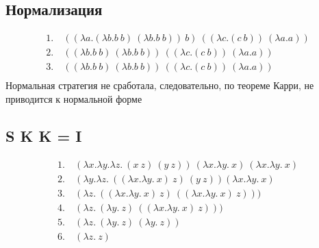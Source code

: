 \documentclass{article}
\begin{document}
\section*{}
\subsection*{Нормализация}

\begin{align*}
1.\ & ((\lambda a.(\lambda b.b\ b)\ (\lambda b.b\ b))\ b)\ ((\lambda c.(c\ b))\ (\lambda a.a)) \\
2.\ & ((\lambda b.b\ b)\ (\lambda b.b\ b))\ ((\lambda c.(c\ b))\ (\lambda a.a)) \\
3.\ & ((\lambda b.b\ b)\ (\lambda b.b\ b))\ ((\lambda c.(c\ b))\ (\lambda a.a)) \\
\end{align*}
Нормальная стратегия не сработала, следовательно, по теореме Карри, не приводится к нормальной форме

\subsection*{S K K = I}
\begin{align*}
1.\ & (\lambda x.\lambda y.\lambda z.\ (x\ z)\ (y\ z))\ (\lambda x.\lambda y.\ x)\ (\lambda x.\lambda y.\ x) \\
2.\ & (\lambda y.\lambda z.\ ((\lambda x.\lambda y.\ x)\ z)\ (y\ z))(\lambda x.\lambda y.\ x)  \\
3.\ & (\lambda z.\ ((\lambda x.\lambda y.\ x)\ z)\ ((\lambda x.\lambda y.\ x)\ z)))  \\
4.\ & (\lambda z.\ (\lambda y.\ z)\ ((\lambda x.\lambda y.\ x)\ z)))  \\
5.\ & (\lambda z.\ (\lambda y.\ z)\  (\lambda y.\ z))  \\
6.\ & (\lambda z.\ z)  \\

\end{align*}
\end{document}
